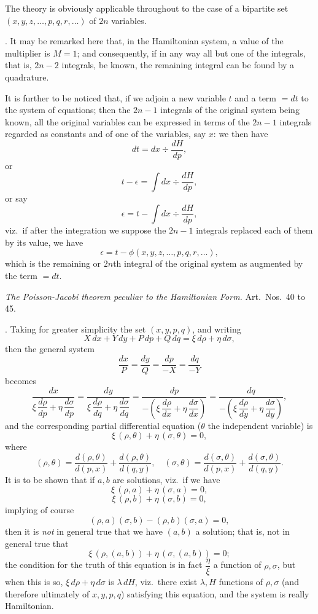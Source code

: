 \documentclass[11pt,a4paper]{article}
\begin{document}
The theory is obviously applicable throughout to the case of a bipartite set $(x, y, z, \ldots, p, q, r, \ldots)$ of $2n$ variables.

\medskip

. It may be remarked here that, in the Hamiltonian system, a value of the multiplier is $M = 1$; and consequently, if in any way all but one of the integrals, that is, $2n - 2$ integrals, be known, the remaining integral can be found by a quadrature.

It is further to be noticed that, if we adjoin a new variable $t$ and a term $= dt$ to the system of equations; then the $2n - 1$ integrals of the original system being known, all the original variables can be expressed in terms of the $2n - 1$ integrals regarded as constants and of one of the variables, say $x$: we then have
\[
dt = dx \div \frac{dH}{dp},
\]
or
\[
t - \epsilon = \int dx \div \frac{dH}{dp},
\]
or say
\[
\epsilon = t - \int dx \div \frac{dH}{dp},
\]
viz.\ if after the integration we suppose the $2n - 1$ integrals replaced each of them by its value, we have
\[
\epsilon = t - \phi(x, y, z, \ldots, p, q, r, \ldots),
\]
which is the remaining or $2n$th integral of the original system as augmented by the term $= dt$.

\newpage


\begin{center}
\emph{The Poisson-Jacobi theorem peculiar to the Hamiltonian Form.} Art.\ Nos.\ 40 to 45.
\end{center}

\medskip

. Taking for greater simplicity the set $(x, y, p, q)$, and writing
\[
X\,dx + Y\,dy + P\,dp + Q\,dq = \xi\,d\rho + \eta\,d\sigma,
\]
then the general system
\[
\frac{dx}{P} = \frac{dy}{Q} = \frac{dp}{-X} = \frac{dq}{-Y}
\]
becomes
\[
\frac{dx}{\xi\,\dfrac{d\rho}{dp} + \eta\,\dfrac{d\sigma}{dp}} = \frac{dy}{\xi\,\dfrac{d\rho}{dq} + \eta\,\dfrac{d\sigma}{dq}} = \frac{dp}{-\!\left(\xi\,\dfrac{d\rho}{dx} + \eta\,\dfrac{d\sigma}{dx}\right)} = \frac{dq}{-\!\left(\xi\,\dfrac{d\rho}{dy} + \eta\,\dfrac{d\sigma}{dy}\right)},
\]
and the corresponding partial differential equation ($\theta$ the independent variable) is
\[
\xi\,(\rho, \theta) + \eta\,(\sigma, \theta) = 0,
\]
where
\[
(\rho, \theta) = \frac{d(\rho, \theta)}{d(p, x)} + \frac{d(\rho, \theta)}{d(q, y)}, \quad (\sigma, \theta) = \frac{d(\sigma, \theta)}{d(p, x)} + \frac{d(\sigma, \theta)}{d(q, y)}.
\]
It is to be shown that if $a, b$ are solutions, viz.\ if we have
\[
\xi\,(\rho, a) + \eta\,(\sigma, a) = 0,
\]
\[
\xi\,(\rho, b) + \eta\,(\sigma, b) = 0,
\]
implying of course
\[
(\rho, a)(\sigma, b) - (\rho, b)(\sigma, a) = 0,
\]
then it is \emph{not} in general true that we have $(a, b)$ a solution; that is, not in general true that
\[
\xi\,(\rho, (a, b)) + \eta\,(\sigma, (a, b)) = 0;
\]
the condition for the truth of this equation is in fact $\dfrac{\eta}{\xi}$ a function of $\rho, \sigma$, but when this is so, $\xi\,d\rho + \eta\,d\sigma$ is $\lambda\,dH$, viz.\ there exist $\lambda, H$ functions of $\rho, \sigma$ (and therefore ultimately of $x, y, p, q$) satisfying this equation, and the system is really Hamiltonian.
\end{document}
